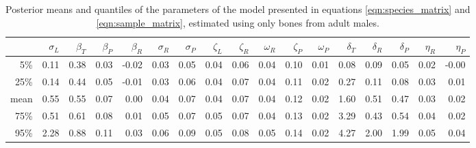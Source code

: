 \documentclass[12pt]{article}
\begin{document}
\begin{table}[ht]
    \footnotesize
\centering
\begin{tabular}{rrrrrrrrrrrrrrrrr}
  \hline
        &  $\sigma_L$  &  $\beta_T$  &  $\beta_P$  &  $\beta_R$  &  $\sigma_R$  &  $\sigma_P$  &  $\zeta_L$  &  $\zeta_R$  &  $\omega_R$  &  $\zeta_P$  &  $\omega_P$  &  $\delta_T$  &  $\delta_R$  &  $\delta_P$  &  $\eta_R$  &  $\eta_P$  \\
\hline
5\%     &  0.11        &  0.38       &  0.03       &  -0.02      &  0.03        &  0.05        &  0.04       &  0.06       &  0.04        &  0.10       &  0.01        &  0.08        &  0.09        &  0.05        &  0.02      &  -0.00     \\
25\%    &  0.14        &  0.44       &  0.05       &  -0.01      &  0.03        &  0.06        &  0.04       &  0.07       &  0.04        &  0.11       &  0.02        &  0.27        &  0.11        &  0.08        &  0.03      &  0.01      \\
mean    &  0.55        &  0.55       &  0.07       &  0.00       &  0.04        &  0.07        &  0.04       &  0.07       &  0.04        &  0.12       &  0.02        &  1.60        &  0.51        &  0.47        &  0.03      &  0.02      \\
75\%    &  0.51        &  0.61       &  0.08       &  0.01       &  0.05        &  0.07        &  0.05       &  0.07       &  0.04        &  0.13       &  0.02        &  3.29        &  0.43        &  0.54        &  0.04      &  0.02      \\
95\%    &  2.28        &  0.88       &  0.11       &  0.03       &  0.06        &  0.09        &  0.05       &  0.08       &  0.05        &  0.14       &  0.02        &  4.27        &  2.00        &  1.99        &  0.05      &  0.04      \\
   \hline
\end{tabular}
\caption{ \label{tab:posterior_distrns} Posterior means and quantiles of the parameters of the model presented in equations \eqref{eqn:species_matrix} and \eqref{eqn:sample_matrix}, estimated using only bones from adult males.  }
\end{table}
\end{document}
